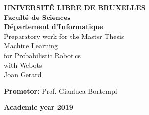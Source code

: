 \begin{titlepage}
    \begin{center}
        
        \normalsize
        \textbf{UNIVERSITÉ LIBRE DE BRUXELLES}\\
        \small
        \textbf{Faculté de Sciences}\\
        \textbf{Département d'Informatique}\\
        
        \vspace{4.0cm}
        \huge
        Preparatory work for the Master Thesis\\
        \vspace{0.5cm}
        \Huge
        Machine Learning\\
        for Probabilistic Robotics\\
        with Webots\\
        
        \vspace{0.5cm}
        \normalsize
        Joan Gerard
        
        \vspace{7cm}
        \small
        \textbf{Promotor:} Prof. Gianluca Bontempi
        
        \vspace{4cm}
        \footnotesize
         \textbf{Academic year 2019}
        
    \end{center}
\end{titlepage}